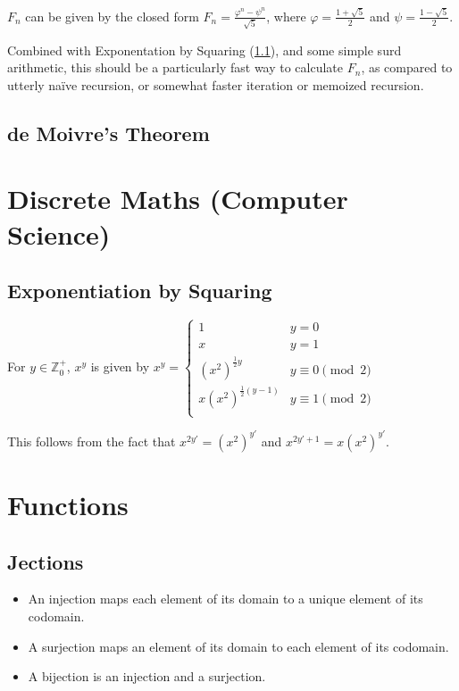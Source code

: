 \documentclass[a4paper,11pt]{article}
\begin{document}
    $F_n$ can be given by the closed form
    $\displaystyle F_n = \frac{\varphi^n - \psi^n}{\sqrt 5}$, where
    $\displaystyle \varphi = \frac{1 + \sqrt 5} 2$ and
    $\displaystyle \psi = \frac{1 - \sqrt 5} 2$.

    Combined with Exponentation by Squaring (\ref{sec:exp_by_squaring}), and
    some simple surd arithmetic, this should be a particularly fast way to
    calculate $F_n$, as compared to utterly na\"ive recursion, or somewhat
    faster iteration or memoized recursion.

    \subsection{de Moivre's Theorem}

    \section{Discrete Maths (Computer Science)}

    \subsection{Exponentiation by Squaring} \label{sec:exp_by_squaring}

    For $y \in \mathbb{Z}_0^+$, $x^y$ is given by
    $x^y =
        \begin{cases}
        1 & y = 0 \\
        x & y = 1 \\
        (x ^ 2)^{\frac 12 y} & y \equiv 0 \pmod 2\\
        x(x ^ 2)^{\frac 12 (y-1)} & y \equiv 1 \pmod 2\\
        \end{cases}$

    This follows from the fact that
    $x^{2y'} = (x^2)^{y'}$ and $x^{2y' + 1} = x(x^2)^{y'}$.

    \section{Functions}

    \subsection{Jections}


    \begin{itemize}
    \item An injection maps each element of its domain to a unique element of
          its codomain.
    \item A surjection maps an element of its domain to each element of its
          codomain.
    \item A bijection is an injection and a surjection.
    \end{itemize}
\end{document}
